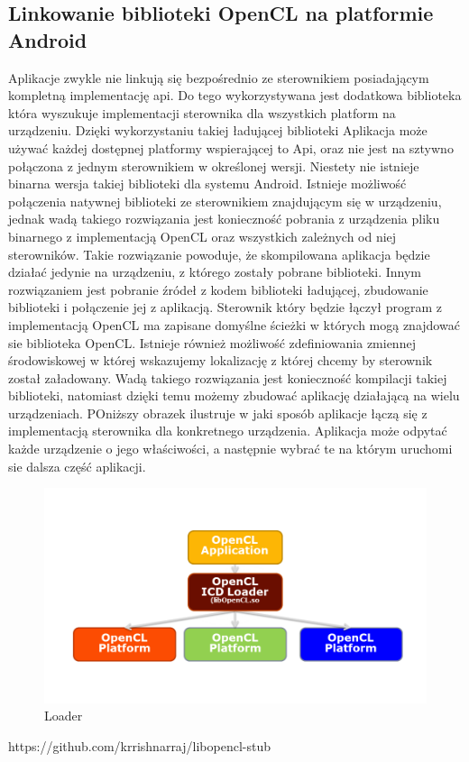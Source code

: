\subsection{Linkowanie biblioteki OpenCL na platformie Android}
Aplikacje zwykle nie linkują się bezpośrednio ze sterownikiem posiadającym kompletną implementację api. Do tego wykorzystywana jest dodatkowa biblioteka która wyszukuje implementacji sterownika dla wszystkich platform na urządzeniu. Dzięki wykorzystaniu takiej ładującej biblioteki Aplikacja może używać każdej dostępnej platformy wspierającej to Api, oraz nie jest na sztywno połączona z jednym sterownikiem w określonej wersji.
Niestety nie istnieje binarna wersja takiej biblioteki dla systemu Android. Istnieje możliwość połączenia natywnej biblioteki ze sterownikiem znajdującym się w urządzeniu, jednak wadą takiego rozwiązania jest konieczność pobrania z urządzenia pliku binarnego z implementacją OpenCL oraz wszystkich zależnych od niej sterowników. Takie rozwiązanie powoduje, że skompilowana aplikacja będzie działać jedynie na urządzeniu, z którego zostały pobrane biblioteki.
Innym rozwiązaniem jest pobranie źródeł z kodem biblioteki ładującej, zbudowanie biblioteki i połączenie jej z aplikacją. Sterownik który będzie łączył program z implementacją OpenCL ma zapisane domyślne ścieżki w których mogą znajdować sie biblioteka OpenCL. Istnieje również możliwość zdefiniowania zmiennej środowiskowej w której wskazujemy lokalizację z której chcemy by sterownik został załadowany. Wadą takiego rozwiązania jest konieczność kompilacji takiej biblioteki, natomiast dzięki temu możemy zbudować aplikację działającą na wielu urządzeniach. POniższy obrazek ilustruje w jaki sposób aplikacje łączą się z implementacją sterownika dla konkretnego urządzenia. Aplikacja może odpytać każde urządzenie o jego właściwości, a następnie wybrać te na którym uruchomi sie dalsza część aplikacji.
\begin{figure}[H]
	\includegraphics[scale=0.4]{imgs/icdLoader.png}
	\caption{Loader}
\end{figure}
https://github.com/krrishnarraj/libopencl-stub

